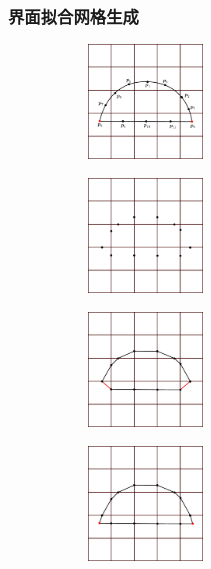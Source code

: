\documentclass[notheorems,serif]{beamer}
\begin{document}
\begin{frame}
    \frametitle{界面拟合网格生成}
\begin{figure}[htbp]
\begin{subfigure}[t]{0.49\linewidth}
    \centering
    \includegraphics[width=1.2in]{../figures/movingmaxwell/interface_half_cricle.pdf}
\end{subfigure}
\begin{subfigure}[t]{0.49\linewidth}
    \centering
    \includegraphics[width=1.2in]{../figures/movingmaxwell/cut_point.pdf}
\end{subfigure}
\end{figure}

\begin{figure}[htbp]
\begin{subfigure}[t]{0.49\linewidth}
    \centering
    \includegraphics[width=1.2in]{../figures/movingmaxwell/cut_mesh_0.pdf}
\end{subfigure}
\begin{subfigure}[t]{0.49\linewidth}
    \centering
    \includegraphics[width=1.2in]{../figures/movingmaxwell/cut_mesh_1.pdf}
\end{subfigure}
\end{figure}


\end{frame}
\end{document}
